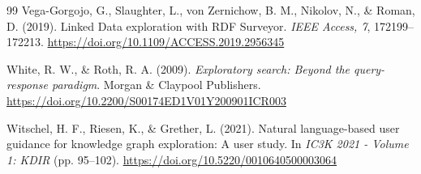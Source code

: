 \documentclass[manuscript,review,screen]{acmart}
\begin{document}
\begin{thebibliography}{99}
 Vega-Gorgojo, G., Slaughter, L., von Zernichow, B. M., Nikolov, N., \& Roman, D. (2019). Linked Data exploration with RDF Surveyor. \textit{IEEE Access, 7}, 172199--172213. \url{https://doi.org/10.1109/ACCESS.2019.2956345}

 White, R. W., \& Roth, R. A. (2009). \textit{Exploratory search: Beyond the query-response paradigm}. Morgan \& Claypool Publishers. \url{https://doi.org/10.2200/S00174ED1V01Y200901ICR003}

 Witschel, H. F., Riesen, K., \& Grether, L. (2021). Natural language-based user guidance for knowledge graph exploration: A user study. In \textit{IC3K 2021 - Volume 1: KDIR} (pp. 95--102). \url{https://doi.org/10.5220/0010640500003064}
\end{thebibliography}
\end{document}
